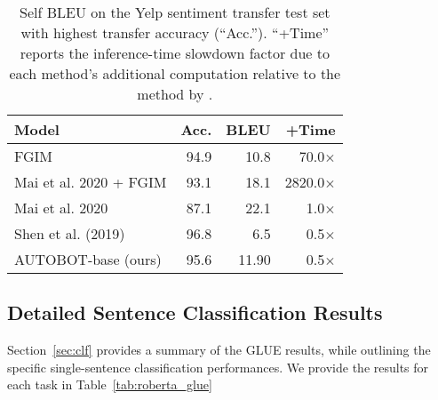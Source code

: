 \begin{table}[ht!]
    \centering
    \footnotesize
  \def\arraystretch{1.1}\tabcolsep=3.5pt
    \begin{tabular}{l|r|r|r}
        \toprule
        \textbf{Model} & \textbf{Acc.} & \textbf{BLEU} & \textbf{+Time} \\
        \toprule
        \hline
        FGIM & 94.9 & 10.8 & 70.0$\times$ \\
        Mai et al. 2020 + FGIM & 93.1 & 18.1 & 2820.0$\times$ \\ 
        Mai et al. 2020 & 87.1 & 22.1  & 1.0$\times$ \\ \hline
        Shen et al. (2019)&  96.8 & 6.5 & 0.5$\times$ \\ 
        AUTOBOT-base (ours) & 95.6 & 11.90 & 0.5$\times$\\\bottomrule
    \end{tabular}\vspace{-1mm}
    \caption{Self BLEU on the Yelp sentiment transfer test set
    with highest transfer accuracy (``Acc.'').  %
    ``+Time'' reports the inference-time slowdown factor due to each method's additional computation relative to the method by \citet{mai2020plug}.%
    }\vspace{-3mm}
    \label{tab:pnp}
\end{table}  

\subsection{Detailed Sentence Classification Results}
Section~\ref{sec:clf} provides a summary of the GLUE results, while outlining the specific single-sentence classification performances. We provide the results for each task in Table~\ref{tab:roberta_glue}



